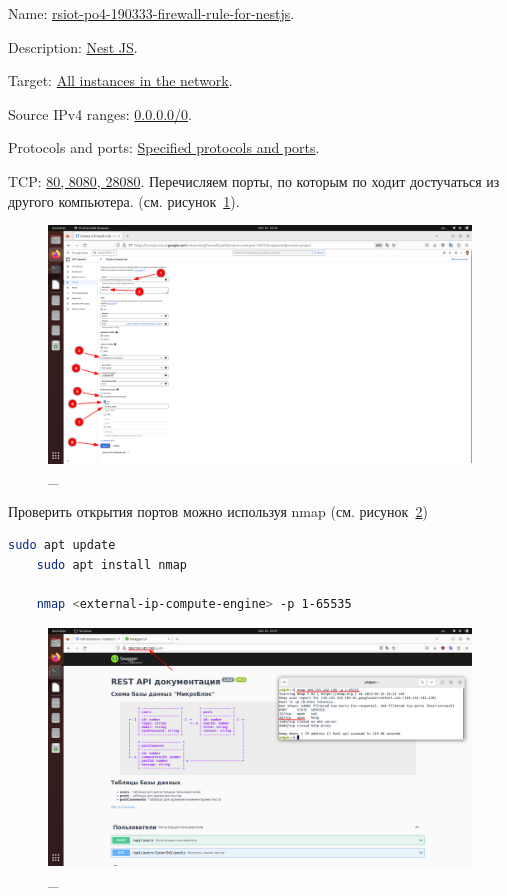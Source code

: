\documentclass[12pt, a4paper, simple]{eskdtext}
\begin{document}
  Name: \underline{rsiot-po4-190333-firewall-rule-for-nestjs}.

  Description: \underline{Nest JS}.

  Target: \underline{All instances in the network}.

  Source IPv4 ranges: \underline{0.0.0.0/0}.

  Protocols and ports: \underline{Specified protocols and ports}.

  TCP: \underline{80, 8080, 28080}.
  Перечисляем порты, по которым по ходит достучаться из другого компьютера.
  (см. рисунок~\ref{fig:17}).

  \begin{figure}[!h]
    \centering
    \includegraphics[width=18cm]
    {images/2023-02-25_23-23-21.png}
    \caption{\_}
    \label{fig:17}
  \end{figure}

  \newpage

  Проверить открытия портов можно используя nmap (см. рисунок~\ref{fig:18})

  \begin{lstlisting}[language=bash,name=Проверяю открыты ли порты через свой ноутбук пингуя IP из nmap]
    sudo apt update
    sudo apt install nmap
    
    nmap <external-ip-compute-engine> -p 1-65535
  \end{lstlisting}

  \begin{figure}[!h]
    \centering
    \includegraphics[width=16cm]
    {images/2023-02-25_23-42-18.png}
    \caption{\_}
    \label{fig:18}
  \end{figure}
\end{document}
